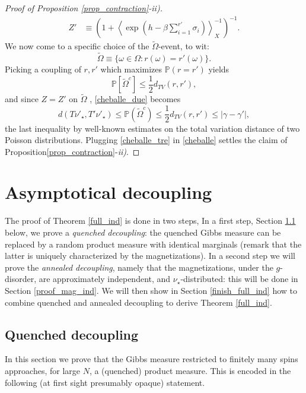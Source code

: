 \documentclass[a4paper,12pt,oneside,reqno]{amsart}
\numberwithin{equation}{section}
\begin{document}
\begin{proof}[Proof of Proposition \ref{prop_contraction}-ii)]
\[\begin{aligned}
Z' &{\equiv} \left(1+ \left< \exp\left(h-\beta\sum_{i=1}^{r'} \sigma_i\right) \right>^{-1}_X \right)^{-1}.
\end{aligned} \]
We now come to a specific choice of the $\tilde \Omega$-event, to wit: $$\tilde \Omega {\equiv} \{\omega \in \Omega: r(\omega) = r'(\omega) \}.$$ Picking a coupling of $r,r'$ which maximizes ${\mathbb{P}}(r=r')$ yields  
$${\mathbb{P}}\left[ \tilde \Omega^c \right] \leq \frac{1}{2} d_{TV}(r, r'), $$
and since $Z = Z'$ on  $\tilde \Omega$ , \eqref{cheballe_due} becomes 
\begin{equation} \label{cheballe_tre}
d\left(T\nu'_\star,T'\nu'_\star\right)  \leq   {\mathbb{P}}\left(\tilde \Omega^c\right)\leq \frac{1}{2}d_{TV}(r,r') \leq  \left|\gamma-\gamma' \right|,
\end{equation}
the last inequality by well-known estimates on the total variation distance of two Poisson distributions. Plugging \eqref{cheballe_tre} in \eqref{cheballe} settles the claim of Proposition\ref{prop_contraction}-{\it ii)}. 
\end{proof}

\section{Asymptotical decoupling}\label{proof}

The proof of Theorem \ref{full_ind} is done in two steps, In a first step, Section \ref{proof_spin_ind} below, we  prove a {\it quenched decoupling}: the quenched Gibbs measure can be replaced by a random product measure with identical marginals (remark that the latter is uniquely characterized by the magnetizations). In a second step we will prove the {\it annealed decoupling}, namely that the magnetizations, under the $g$-disorder, are approximately independent, and $\nu_\star$-distributed: this will be done in Section \ref{proof_mag_ind}. We will then show in Section \ref{finish_full_ind} how to combine quenched and annealed decoupling to derive Theorem \ref{full_ind}. 

\subsection{Quenched decoupling}\label{proof_spin_ind}
In this section we prove that the Gibbs measure restricted to finitely many spins approaches, for large $N$, a (quenched) product measure. This is encoded in the following (at first sight presumably opaque) statement. 
\end{document}
